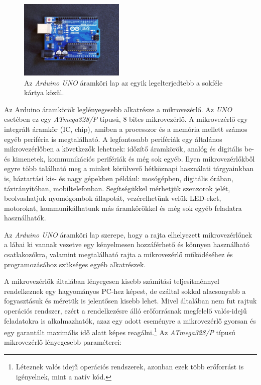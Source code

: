 \documentclass{thesis-ekf}
\theoremstyle{definition}
\begin{document}
\begin{figure}[ht!]
	\centering
	\includegraphics[width=5cm]{arduinoUno.jpg}
	\caption{Az \emph{Arduino UNO} áramköri lap az egyik legelterjedtebb a sokféle kártya közül.}
	\label{fig-arduinoUno}
\end{figure}

Az Arduino áramkörök leglényegesebb alkatrésze a mikrovezérlő. Az \emph{UNO} esetében ez egy \emph{ATmega328/P} típusú, 8 bites mikrovezérlő. A mikrovezérlő egy integrált áramkör (IC, chip), amiben a processzor és a memória mellett számos egyéb periféria is megtalálható. A legfontosabb perifériák egy általános mikrovezérlőben a következők lehetnek: időzítő áramkörök, analóg és digitális be- és kimenetek, kommunikációs perifériák és még sok egyéb. Ilyen mikrovezérlőkből egyre több található meg a minket körülvevő hétköznapi használati tárgyainkban is, háztartási kis- és nagy gépekben például: mosógépben, digitális órában, távirányítóban, mobiltelefonban. Segítségükkel mérhetjük szenzorok jelét, beolvashatjuk nyomógombok állapotát, vezérelhetünk velük LED-eket, motorokat, kommunikálhatunk más áramkörökkel és még sok egyéb feladatra használhatók.

Az \emph{Arduino UNO} áramköri lap szerepe, hogy a rajta elhelyezett mikrovezérlőnek a lábai ki vannak vezetve egy kényelmesen hozzáférhető és könnyen használható csatlakozókra, valamint megtalálható rajta a mikrovezérlő működéséhez és programozásához szükséges egyéb alkatrészek.

A mikrovezérlők általában lényegesen kisebb számítási teljesítménnyel rendelkeznek egy hagyományos PC-hez képest, de ezáltal sokkal alacsonyabb a fogyasztásuk és méretük is jelentősen kisebb lehet. Mivel általában nem fut rajtuk operációs rendszer, ezért a rendelkezésre álló erőforrásnak megfelelő valós-idejű feladatokra is alkalmazhatók, azaz egy adott eseményre a mikrovezérlő gyorsan és egy garantált maximális idő alatt képes reagálni.\footnote{Léteznek valós idejű operációs rendszerek, azonban ezek több erőforrást is igényelnek, mint a natív kód.}  Az \emph{ATmega328/P} típusú mikrovezérlő lényegesebb paraméterei:
\end{document}

